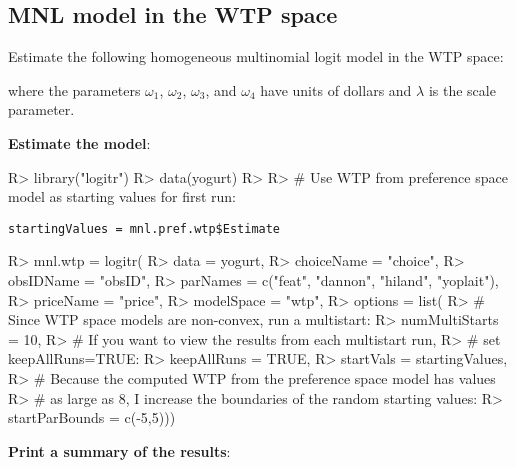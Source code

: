 \documentclass[article]{jss}
\begin{document}
\newpage

\hypertarget{mnl-model-in-the-wtp-space}{%
\subsection{MNL model in the WTP
space}\label{mnl-model-in-the-wtp-space}}

Estimate the following homogeneous multinomial logit model in the WTP
space:



where the parameters \(\omega_1\), \(\omega_2\), \(\omega_3\), and
\(\omega_4\) have units of dollars and \(\lambda\) is the scale
parameter.

\textbf{Estimate the model}:

\begin{CodeChunk}

\begin{CodeInput}
R> library("logitr")
R> data(yogurt)
R> 
R> # Use WTP from preference space model as starting values for first run:
\end{CodeInput}
\end{CodeChunk}

\texttt{startingValues\ =\ mnl.pref.wtp\$Estimate}

\begin{CodeChunk}

\begin{CodeInput}
R> mnl.wtp = logitr(
R>   data       = yogurt,
R>   choiceName = "choice",
R>   obsIDName  = "obsID",
R>   parNames   = c("feat", "dannon", "hiland", "yoplait"),
R>   priceName  = "price",
R>   modelSpace = "wtp",
R>   options = list(
R>     # Since WTP space models are non-convex, run a multistart:
R>     numMultiStarts = 10,
R>     # If you want to view the results from each multistart run,
R>     # set keepAllRuns=TRUE:
R>     keepAllRuns = TRUE,
R>     startVals   = startingValues,
R>     # Because the computed WTP from the preference space model has values
R>     # as large as 8, I increase the boundaries of the random starting values:
R>     startParBounds = c(-5,5)))
\end{CodeInput}
\end{CodeChunk}

\textbf{Print a summary of the results}:
\end{document}
